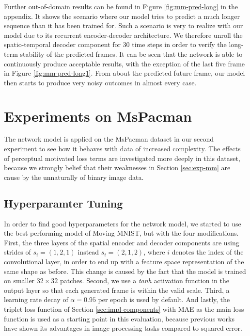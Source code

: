 Further out-of-domain results can be found in Figure \ref{fig:mm-pred-long} in the appendix. It shows the scenario where our model tries to predict a much longer sequence than it has been trained for. Such a scenario is very to realize with our model due to its recurrent encoder-decoder architecture. We therefore unroll the spatio-temporal decoder component for \num{30} time steps in order to verify the long-term stability of the predicted frames. It can be seen that the network is able to continuously produce acceptable results, with the exception of the last five frame in Figure \ref{fig:mm-pred-long1}. From about the  predicted future frame, our model then starts to produce very noisy outcomes in almost every case.






























\section{Experiments on MsPacman} \label{sec:exp-pac}

The network model is applied on the MsPacman dataset in our second experiment to see how it behaves with data of increased complexity. The effects of perceptual motivated loss terms are investigated more deeply in this dataset, because we strongly belief that their weaknesses in Section \ref{sec:exp-mm} are cause by the unnaturally of binary image data.


\subsection{Hyperparamter Tuning}

In order to find good hyperparameters for the network model, we started to use the best performing model of Moving MNIST, but with the four modifications. First, the three layers of the spatial encoder and decoder components are using strides of $s_i=(1, 2, 1)$ instead $s_i=(2, 1, 2)$, where $i$ denotes the index of the convolutional layer, in order to end up with a feature space representation of the same shape as before. This change is caused by the fact that the model is trained on smaller $32 \times 32$ patches. Second, we use a \textit{tanh} activation function in the output layer so that each generated frame is within the valid scale. Third, a learning rate decay of $\alpha=0.95$ per epoch is used by default. And lastly, the triplet loss function of Section \ref{sec:impl-components} with MAE as the main loss function is used as a starting point in this evaluation, because previous works have shown its advantages in image processing tasks compared to squared error.


